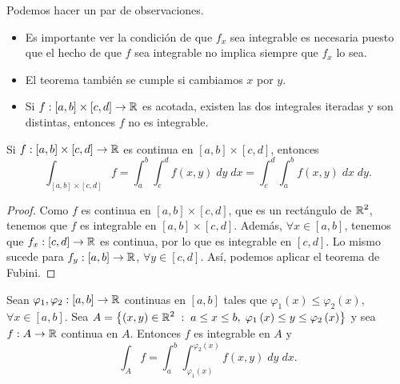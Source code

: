 \begin{observation} Podemos hacer un par de observaciones.
	\begin{itemize}
	\item Es importante ver la condición de que $\displaystyle f_{x} $ sea integrable es necesaria puesto que el hecho de que $\displaystyle f $ sea integrable no implica siempre que $\displaystyle f_{x} $ lo sea.
	\item El teorema también se cumple si cambiamos $\displaystyle x $ por $\displaystyle y $.
	\item Si $\displaystyle f : \left[a,b\right] \times \left[c,d\right] \to \mathbb{R} $ es acotada, existen las dos integrales iteradas y son distintas, entonces $\displaystyle f $ no es integrable.
	\end{itemize}
\end{observation}
\begin{colorary}
	Si $\displaystyle f : \left[a,b\right] \times \left[c,d\right] \to \mathbb{R} $ es continua en $\displaystyle \left[a,b\right] \times \left[c,d\right]  $, entonces 
	\[\int _{\left[a,b\right] \times \left[c,d\right] }f =\int^{b}_{a} \int^{d}_{c} f\left(x,y\right) \; dy \; dx =\int^{d}_{c} \int^{b}_{a} f\left(x,y\right) \; dx \; dy.\]
\end{colorary}
\begin{proof}
	Como $\displaystyle f $ es continua en $\displaystyle \left[a,b\right] \times \left[c,d\right]  $, que es un rectángulo de $\displaystyle \mathbb{R}^{2} $, tenemos que $\displaystyle f $ es integrable en $\displaystyle \left[a,b\right] \times \left[c,d\right]  $. Además, $\displaystyle \forall x \in \left[a,b\right]  $, tenemos que $\displaystyle f_{x} : \left[c,d\right] \to \mathbb{R} $ es continua, por lo que es integrable en $\displaystyle \left[c,d\right]  $. 
	Lo mismo sucede para $\displaystyle f_{y} : \left[a,b\right] \to \mathbb{R} $, $\displaystyle \forall y \in \left[c,d\right]  $. Así, podemos aplicar el teorema de Fubini.
\end{proof}
\begin{colorary}
	Sean $\displaystyle \varphi_{1}, \varphi_{2} : \left[a,b\right] \to \mathbb{R} $ continuas en $\displaystyle \left[a,b\right]  $ tales que $\displaystyle \varphi_{1}\left(x\right)\leq \varphi_{2}\left(x\right) $, $\displaystyle \forall x \in \left[a,b\right]  $. Sea $\displaystyle A = \left\{ \left(x,y\right) \in \mathbb{R}^{2} \; : \; a \leq x \leq b, \; \varphi_{1}\left(x\right)\leq y \leq \varphi_{2}\left(x\right)\right\} $ y sea $\displaystyle f : A \to \mathbb{R} $ continua en $\displaystyle A $. 
	Entonces $\displaystyle f $ es integrable en $\displaystyle A $ y 
	\[\int _{A}f = \int^{b}_{a} \int^{\varphi_{2}\left(x\right)}_{\varphi_{1}\left(x\right)} f\left(x,y\right)  \; dy \; dx .\]
	
\end{colorary}
